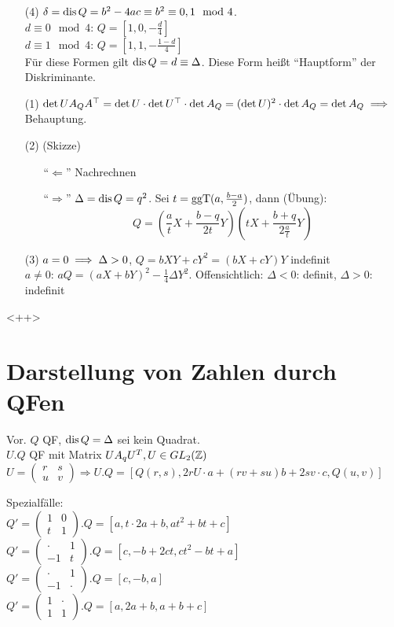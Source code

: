 \documentclass[a4paper,twoside,DIV15,BCOR12mm]{scrbook}
\begin{document}
\begin{beweis}
\begin{enumerate}
\item[(4)] $\delta = \mathop{\rm dis}\nolimits Q = b^2 - 4ac \equiv b^2 \equiv 0,1 \mod 4$. \\
$d\equiv 0 \mod 4$: $Q=[1,0,-\frac d 4]$ \\
$d\equiv 1 \mod 4$: $Q=[1,1,-\frac {1-d} 4]$ \\
Für diese Formen gilt $\mathop{\rm dis}\nolimits Q = d \equiv \Delta$. Diese Form heißt "`Hauptform"' der Diskriminante.
\item[(1)] $\det UA_QA^\top = \det U \cdot \det U^\top \cdot \det A_Q = (\det U)^2 \cdot \det A_Q = \det A_Q \implies$ Behauptung.
\item[(2)] (Skizze)
\begin{enumerate}
\item["`$\Leftarrow$"'] Nachrechnen
\item["`$\Rightarrow$"'] $\Delta = \mathop{\rm dis}\nolimits Q = q^2$. Sei $t=\mathop{\rm ggT}\nolimits(a, \frac {b-a} 2)$, dann (Übung):
\[ Q=(\frac a t X + \frac {b-q} {2t} Y)(t X + \frac{b+q}{2\frac at} Y) \]
\end{enumerate}
\item[(3)] $a=0\implies \Delta > 0$, $Q=bXY + cY^2 = (bX + cY) Y$ indefinit\\
$a\ne 0$: $aQ = (aX+bY)^2 - \frac 14 \Delta Y^2$. Offensichtlich: $\Delta < 0$: definit, $\Delta > 0$: indefinit
\end{enumerate}
\end{beweis}<++>

\section{Darstellung von Zahlen durch QFen}
Vor. $Q$ QF, $\mathop{\rm dis}\nolimits Q = \Delta$ sei kein Quadrat.\\
$U.Q$ QF mit Matrix $UA_qU^T, U \in GL_2(\mathbb{Z})$\\
$U = \begin{pmatrix}r & s \\ u & v\end{pmatrix} \Rightarrow U.Q = [Q(r,s), 2rU\cdot a + (rv + su)b + 2sv\cdot c, Q(u,v)]$

Spezialfälle:\\
$Q' = \begin{pmatrix}1 & 0\\t & 1\end{pmatrix}.Q = [a, t \cdot 2a + b, at^2 + bt + c]$\\
$Q' = \begin{pmatrix}\cdot & 1\\ -1 & t\end{pmatrix}.Q = [c, -b + 2ct, ct^2 - bt + a]$\\
$Q' = \begin{pmatrix}\cdot & 1\\ -1 & \cdot\end{pmatrix}.Q = [c, -b, a]$\\
$Q' = \begin{pmatrix}1 & \cdot\\1 & 1\end{pmatrix}.Q = [a, 2a + b, a + b + c]$
\end{document}
